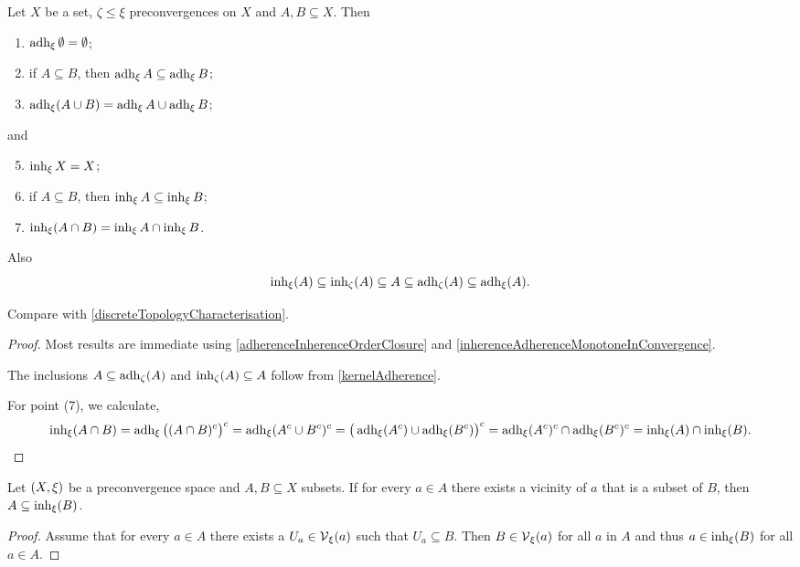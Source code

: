 \begin{corollary} \label{principalInherenceAdherenceProperties}
Let $X$ be a set, $\zeta\leq \xi$ preconvergences on $X$ and $A,B \subseteq X$. Then
\begin{enumerate}
\item $\operatorname{adh}_\xi \emptyset = \emptyset$;
\item if $A \subseteq B$, then $\operatorname{adh}_\xi A \subseteq \operatorname{adh}_\xi B$;
\item $\operatorname{adh}_\xi(A\cup B) = \operatorname{adh}_\xi A \cup \operatorname{adh}_\xi B$;
\end{enumerate}
and
\begin{enumerate} \setcounter{enumi}{4}
\item $\operatorname{inh}_\xi X = X$;
\item if $A \subseteq B$, then $\operatorname{inh}_\xi A \subseteq \operatorname{inh}_\xi B$;
\item $\operatorname{inh}_\xi(A\cap B) = \operatorname{inh}_\xi A \cap \operatorname{inh}_\xi B$.
\end{enumerate}
Also
\[ \operatorname{inh}_\xi(A) \subseteq \operatorname{inh}_\zeta(A) \subseteq A \subseteq \operatorname{adh}_\zeta(A) \subseteq \operatorname{adh}_\xi(A). \]
\end{corollary}
Compare with \ref{discreteTopologyCharacterisation}.
\begin{proof}
Most results are immediate using \ref{adherenceInherenceOrderClosure} and \ref{inherenceAdherenceMonotoneInConvergence}.

The inclusions $A \subseteq \operatorname{adh}_\zeta(A)$ and $\operatorname{inh}_\zeta(A) \subseteq A$ follow from \ref{kernelAdherence}.

For point (7), we calculate,
\[ \operatorname{inh}_\xi(A\cap B) = \operatorname{adh}_\xi\big((A\cap B)^c\big)^c = \operatorname{adh}_\xi(A^c\cup B^c)^c = \big(\operatorname{adh}_\xi(A^c)\cup \operatorname{adh}_\xi(B^c)\big)^c = \operatorname{adh}_\xi(A^c)^c\cap \operatorname{adh}_\xi(B^c)^c = \operatorname{inh}_\xi(A) \cap \operatorname{inh}_\xi(B). \]
\end{proof}


\begin{lemma} \label{subsetWithVicinitiesInInherence}
Let $\left( X,\xi \right)$ be a preconvergence space and $A,B\subseteq X$ subsets. If for every $a\in A$ there exists a vicinity of $a$ that is a subset of $B$, then $A\subseteq \operatorname{inh}_\xi(B)$.
\end{lemma}
\begin{proof}
Assume that for every $a\in A$ there exists a $U_a \in \operatorname{\mathcal{V}}_\xi(a)$ such that $U_a \subseteq B$. Then $B\in \operatorname{\mathcal{V}}_\xi(a)$ for all $a$ in $A$ and thus $a\in \operatorname{inh}_\xi(B)$ for all $a\in A$.
\end{proof}

